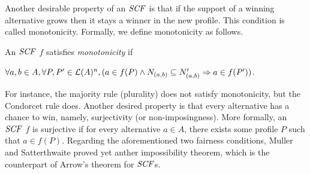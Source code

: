 %
%
%
%

Another desirable property of an $\it{SCF}$ is that if the support of a winning
alternative grows then it stays a winner in the new profile.
This condition is called monotonicity. Formally, we define monotonicity as follows.

\begin{definition}
	An $\it{SCF}$ $f$ satisfies \textit{monotonicity} if 
	\begin{center}
		$\forall a,b \in A, \forall P,P' \in \mathcal{L}(A)^n, (a \in f(P) \wedge 
		N_{(a,b)} \subseteq N'_{(a,b)} \Rightarrow a \in f(P'))$.
	\end{center}
\end{definition}

For instance, the majority rule (plurality) does not satisfy monotonicity, but 
the Condorcet rule does.  Another desired property is that every alternative
has a chance to win, namely, surjectivity (or non-imposingness).  More formally, 
an $\it{SCF}$ $f$ is surjective if for every alternative $a \in A$, there exists
some profile $P$ such that $a \in f(P)$.
Regarding the aforementioned two fairness conditions, Muller and Satterthwaite \cite{Mull_Satt}
proved yet anther impossibility theorem, which is the counterpart of Arrow's theorem
for $\it{SCF}$s.

